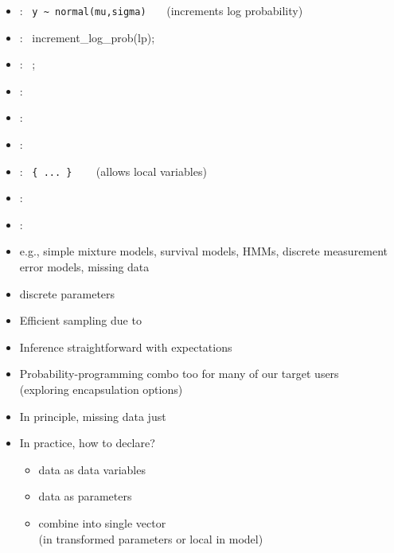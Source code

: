 \documentclass[10pt]{report}
\begin{document}
\vspace*{-4pt}
\begin{itemize}
\item {}: \ {\footnotesize \Verb|y ~ normal(mu,sigma)|}
  \ \ \ {\footnotesize (increments log probability)}
\item {}: \ {\footnotesize increment\_log\_prob(lp);}
\item {}: \  {\footnotesize {};}
\item {}: \ {\footnotesize {}}
\item {}: \ {\footnotesize {}}
\item {}: \ {\footnotesize
    }
\item {}: \ {\footnotesize \Verb|{ ... }|}  \ \ \ {\footnotesize
    (allows local variables)}
\item {}: \ {\footnotesize {}}
\item {}: 
\ {\footnotesize 
    }
\end{itemize}



\begin{itemize}
\item e.g., simple mixture models, survival models, HMMs,
  discrete measurement error models, missing data
\item {} discrete parameters
\item Efficient sampling due to 
\item Inference straightforward with expectations
  \vspace*{12pt}
\item Probability-programming combo too  for many of our target users
  \\
  {\small (exploring encapsulation options)}
\end{itemize}

\begin{itemize}
\item In principle, missing data just 
\item In practice, how to declare? 
  \begin{itemize}
  \item {} data as data variables
  \item {} data as parameters
  \item combine into single vector 
    \\ {\footnotesize (in transformed parameters or local in model)}
  \end{itemize}
\end{itemize}
\end{document}
